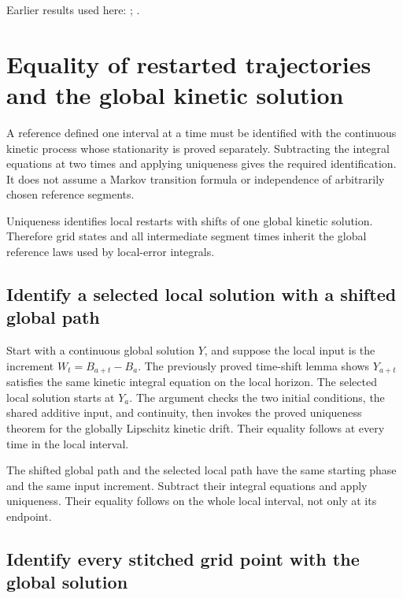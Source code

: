 \documentclass[11pt,a4paper]{report}
\begin{document}
Earlier results used here: \cite[Section~3.8.16]{LangevinLean2026ULASC}; \cite[Section~3.8.17]{LangevinLean2026ULASC}.
\section{\texorpdfstring{Equality of restarted trajectories and the global kinetic solution}{Equality of restarted trajectories and the global kinetic solution}}
\label{proof-module-KineticLangevin-SegmentGlobal-lean}


A reference defined one interval at a time must be identified with the continuous kinetic process whose stationarity is proved separately. Subtracting the integral equations at two times and applying uniqueness gives the required identification. It does not assume a Markov transition formula or independence of arbitrarily chosen reference segments.



Uniqueness identifies local restarts with shifts of one global kinetic solution. Therefore grid states and all intermediate segment times inherit the global reference laws used by local-error integrals.

\subsection{\texorpdfstring{Identify a selected local solution with a shifted global path}{Identify a selected local solution with a shifted global path}}
\label{report-step-KineticLangevin-SegmentGlobal-lean-1}


Start with a continuous global solution \(Y\), and suppose the local input is the increment \(W_t=B_{a+t}-B_a\). The previously proved time-shift lemma shows \(Y_{a+t}\) satisfies the same kinetic integral equation on the local horizon. The selected local solution starts at \(Y_a\). The argument checks the two initial conditions, the shared additive input, and continuity, then invokes the proved uniqueness theorem for the globally Lipschitz kinetic drift. Their equality follows at every time in the local interval.



The shifted global path and the selected local path have the same starting phase and the same input increment. Subtract their integral equations and apply uniqueness. Their equality follows on the whole local interval, not only at its endpoint.

\subsection{\texorpdfstring{Identify every stitched grid point with the global solution}{Identify every stitched grid point with the global solution}}
\label{report-step-KineticLangevin-SegmentGlobal-lean-2}
\end{document}
